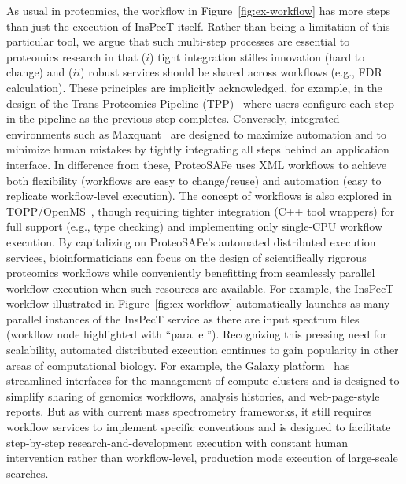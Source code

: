 \documentclass[arial,11pt]{article}
\newcommand{\SF}[1]{\textsf{#1}}
\newcommand{\SYSTEM}[0]{\SF{ProteoSAFe}\xspace}
\begin{document}
As usual in proteomics, the workflow in Figure~\ref{fig:ex-workflow} has more steps than just the execution of InsPecT itself. Rather than being a limitation of this particular tool, we argue that such multi-step processes are essential to proteomics research in that ($i$) tight integration stifles innovation (hard to change) and ($ii$) robust services should be shared across workflows (e.g., FDR calculation). These principles are implicitly acknowledged, for example, in the design of the Trans-Proteomics Pipeline (TPP)~\cite{Deutsch:2010} where users configure each step in the pipeline as the previous step completes. Conversely, integrated environments such as Maxquant~\cite{Juergen:2008} are designed to maximize automation and to minimize human mistakes by tightly integrating all steps behind an application interface. In difference from these, \SYSTEM uses XML workflows to achieve both flexibility (workflows are easy to change/reuse) and automation (easy to replicate workflow-level execution). The concept of workflows is also explored in TOPP/OpenMS~\cite{Reinert:2010}, though requiring tighter integration (C++ tool wrappers) for full support (e.g., type checking) and implementing only single-CPU workflow execution. By capitalizing on \SYSTEM's automated distributed execution services, bioinformaticians can focus on the design of scientifically rigorous proteomics workflows while conveniently benefitting from seamlessly parallel workflow execution when such resources are available. For example, the InsPecT workflow illustrated in Figure~\ref{fig:ex-workflow} automatically launches as many parallel instances of the InsPecT service as there are input spectrum files (workflow node highlighted with ``parallel'').
%
Recognizing this pressing need for scalability, automated distributed execution continues to gain popularity in other areas of computational biology. For example, the Galaxy platform~\cite{Goecks:2010} has streamlined interfaces for the management of compute clusters and is designed to simplify sharing of genomics workflows, analysis histories, and web-page-style reports. But as with current mass spectrometry frameworks, it still requires workflow services to implement specific conventions and is designed to facilitate step-by-step research-and-development execution with constant human intervention rather than workflow-level, production mode execution of large-scale searches.
\end{document}
